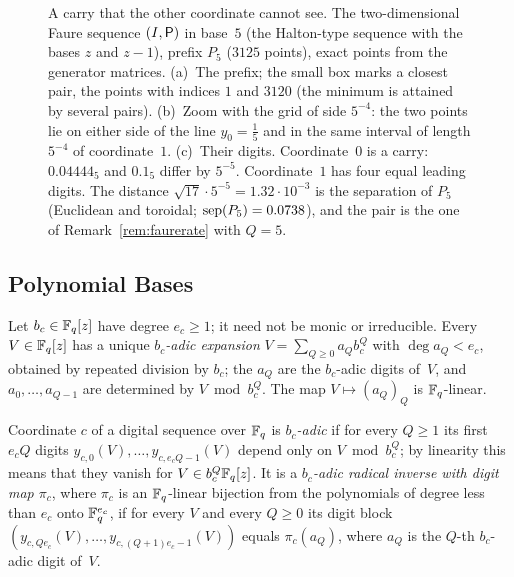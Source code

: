 \begin{figure}[tb]
\centering
{}
\caption{A carry that the other coordinate cannot see. The two-dimensional Faure sequence $(I,\mathsf{P})$ in base~$5$ (the Halton-type sequence with the bases $z$ and $z-1$), prefix $P_5$ ($3125$ points), exact points from the generator matrices. (a)~The prefix; the small box marks a closest pair, the points with indices $1$ and $3120$ (the minimum is attained by several pairs). (b)~Zoom with the grid of side $5^{-4}$: the two points lie on either side of the line $y_0=\frac15$ and in the same interval of length $5^{-4}$ of coordinate~$1$. (c)~Their digits. Coordinate~$0$ is a carry: $0.04444_5$ and $0.1_5$ differ by $5^{-5}$. Coordinate~$1$ has four equal leading digits. The distance $\sqrt{17}\cdot5^{-5}=1.32\cdot10^{-3}$ is the separation of $P_5$ (Euclidean and toroidal; $\operatorname{sep}(P_5)=0.0738$), and the pair is the one of Remark~\ref{rem:faurerate} with $Q=5$.}
\label{fig:carry}
\end{figure}

\subsection{Polynomial Bases}\label{sec:polybases}
Let $b_c\in\mathbb{F}_q[z]$ have degree $e_c\ge1$; it need not be monic or irreducible. Every $V\in\mathbb{F}_q[z]$ has a unique \emph{$b_c$-adic expansion} $V=\sum_{Q\ge0}a_Qb_c^Q$ with $\deg a_Q<e_c$, obtained by repeated division by $b_c$; the $a_Q$ are the $b_c$-adic digits of~$V$, and $a_0,\dots,a_{Q-1}$ are determined by $V\bmod b_c^Q$. The map $V\mapsto(a_Q)_Q$ is $\mathbb{F}_q$-linear.

\begin{definition}\label{def:radinv}
Coordinate $c$ of a digital sequence over $\mathbb{F}_q$ is \emph{$b_c$-adic} if for every $Q\ge1$ its first $e_cQ$ digits $y_{c,0}(V),\dots,y_{c,e_cQ-1}(V)$ depend only on $V\bmod b_c^Q$; by linearity this means that they vanish for $V\in b_c^Q\mathbb{F}_q[z]$. It is a \emph{$b_c$-adic radical inverse with digit map $\pi_c$}, where $\pi_c$ is an $\mathbb{F}_q$-linear bijection from the polynomials of degree less than $e_c$ onto $\mathbb{F}_q^{e_c}$, if for every $V$ and every $Q\ge0$ its digit block $(y_{c,Qe_c}(V),\dots,y_{c,(Q+1)e_c-1}(V))$ equals $\pi_c(a_Q)$, where $a_Q$ is the $Q$-th $b_c$-adic digit of~$V$.
\end{definition}

